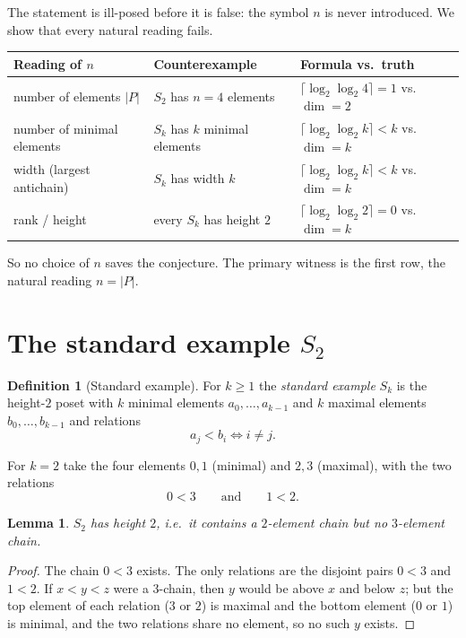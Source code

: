 \documentclass[11pt]{article}
\newtheorem{lemma}[theorem]{Lemma}
\theoremstyle{definition}
\newtheorem{definition}[theorem]{Definition}
\theoremstyle{remark}
\begin{document}
The statement is ill-posed before it is false: the symbol $n$ is never
introduced. We show that every natural reading fails.

\begin{center}
\begin{tabular}{p{} p{} p{}}
\toprule
Reading of $n$ & Counterexample & Formula vs.\ truth \\
\midrule
number of elements $|P|$ & $S_2$ has $n=4$ elements & $\lceil \log_2\log_2 4\rceil = 1$ vs.\ $\dim = 2$ \\
number of minimal elements & $S_k$ has $k$ minimal elements & $\lceil \log_2\log_2 k\rceil < k$ vs.\ $\dim = k$ \\
width (largest antichain) & $S_k$ has width $k$ & $\lceil \log_2\log_2 k\rceil < k$ vs.\ $\dim = k$ \\
rank / height & every $S_k$ has height $2$ & $\lceil \log_2\log_2 2\rceil = 0$ vs.\ $\dim = k$ \\
\bottomrule
\end{tabular}
\end{center}

So no choice of $n$ saves the conjecture. The primary witness is the first row,
the natural reading $n = |P|$.

\section{The standard example \texorpdfstring{$S_2$}{S2}}

\begin{definition}[Standard example]\label{def:Sk}
For $k \ge 1$ the \emph{standard example} $S_k$ is the height-$2$ poset with
$k$ minimal elements $a_0,\dots,a_{k-1}$ and $k$ maximal elements
$b_0,\dots,b_{k-1}$ and relations
\[
a_j < b_i \iff i \neq j .
\]
\end{definition}

For $k=2$ take the four elements $0,1$ (minimal) and $2,3$ (maximal), with the
two relations
\[
0 < 3 \qquad\text{and}\qquad 1 < 2 .
\]

\begin{lemma}\label{lem:height}
$S_2$ has height $2$, i.e.\ it contains a $2$-element chain but no
$3$-element chain.
\end{lemma}

\begin{proof}
The chain $0<3$ exists. The only relations are the disjoint pairs $0<3$ and
$1<2$. If $x<y<z$ were a $3$-chain, then $y$ would be above $x$ and below $z$;
but the top element of each relation ($3$ or $2$) is maximal and the bottom
element ($0$ or $1$) is minimal, and the two relations share no element, so no
such $y$ exists.
\end{proof}
\end{document}

